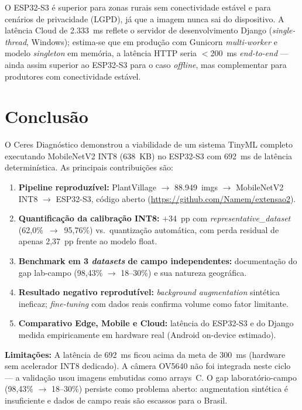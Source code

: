 \documentclass[12pt]{article}
\begin{document}
O ESP32-S3 é superior para zonas rurais sem conectividade estável e para cenários
de privacidade (LGPD), já que a imagem nunca sai do dispositivo. A latência Cloud
de 2.333~ms reflete o servidor de desenvolvimento Django (\textit{single-thread},
Windows); estima-se que em produção com Gunicorn \textit{multi-worker} e modelo
\textit{singleton} em memória, a latência HTTP seria $<$200~ms \textit{end-to-end}
--- ainda assim superior ao ESP32-S3 para o caso \textit{offline}, mas complementar
para produtores com conectividade estável.


\section{Conclusão}

O Ceres Diagnóstico demonstrou a viabilidade de um sistema TinyML completo
executando MobileNetV2 INT8 (638~KB) no ESP32-S3 com 692~ms de latência
determinística. As principais contribuições são:

\begin{enumerate}
  \item \textbf{Pipeline reproduzível:} PlantVillage $\to$ 88.949~imgs $\to$
        MobileNetV2 INT8 $\to$ ESP32-S3, código aberto (\url{https://github.com/Namem/extensao2}).
  \item \textbf{Quantificação da calibração INT8:} $+$34~pp com
        \textit{representative\_dataset} (62,0\%~$\to$~95,76\%) vs.\ quantização
        automática, com perda residual de apenas 2,37~pp frente ao modelo float.
  \item \textbf{Benchmark em 3 \textit{datasets} de campo independentes:} documentação do
        gap lab-campo (98,43\% $\to$ 18--30\%) e sua natureza geográfica.
  \item \textbf{Resultado negativo reprodutível:} \textit{background augmentation} sintética
        ineficaz; \textit{fine-tuning} com dados reais confirma volume como fator limitante.
  \item \textbf{Comparativo Edge, Mobile e Cloud:} latência do ESP32-S3 e do
        Django medida empiricamente em hardware real (Android on-device estimado).
\end{enumerate}

\textbf{Limitações:} A latência de 692~ms ficou acima da meta de 300~ms (hardware
sem acelerador INT8 dedicado). A câmera OV5640 não foi integrada neste ciclo ---
a validação usou imagens embutidas como arrays~C. O gap laboratório-campo
(98,43\% $\to$ 18--30\%) persiste como problema aberto: augmentation sintética
é insuficiente e dados de campo reais são escassos para o Brasil.
\end{document}
